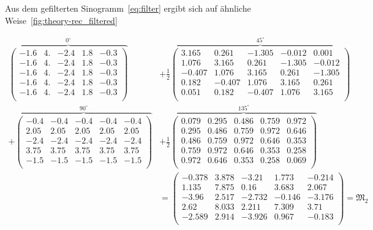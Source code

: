 \documentclass[slug=PET, room=Andreas-Schubert-Bau\,\ 424A,
supervisor=Carsten\ Bittrich, coursedate=10.\ 01.\ 2020, ngerman]{../../Lab_Report_LaTeX/lab_report}
\begin{document}
Aus dem gefilterten Sinogramm~\eqref{eq:filter} ergibt sich auf
\"ahnliche Weise~\ref{fig:theory-rec_filtered}

{\footnotesize
\setlength{\arraycolsep}{2.5pt}

\begin{align}
  \label{eq:simplerepr}
  \overbrace{\begin{pmatrix}
      -1.6 & 4. & -2.4 & 1.8 & -0.3\\
      -1.6 & 4. & -2.4 & 1.8 & -0.3\\
      -1.6 & 4. & -2.4 & 1.8 & -0.3\\
      -1.6 & 4. & -2.4 & 1.8 & -0.3\\
      -1.6 & 4. & -2.4 & 1.8 & -0.3\\
    \end{pmatrix}}^{0^\circ} & + \frac{1}{2}\overbrace{\begin{pmatrix}
      3.165 & 0.261 & -1.305 & -0.012 & 0.001\\
      1.076 & 3.165 & 0.261 & -1.305 & -0.012\\
      -0.407 & 1.076 & 3.165 & 0.261 & -1.305\\
      0.182 & -0.407 & 1.076 & 3.165 & 0.261\\
      0.051 & 0.182 & -0.407 & 1.076 & 3.165\\
    \end{pmatrix}}^{45^\circ} \nonumber \\ +
  \overbrace{\begin{pmatrix}
      -0.4 & -0.4 & -0.4 & -0.4 & -0.4\\
      2.05 & 2.05 & 2.05 & 2.05 & 2.05\\
      -2.4 & -2.4 & -2.4 & -2.4 & -2.4\\
      3.75 & 3.75 & 3.75 & 3.75 & 3.75\\
      -1.5 & -1.5 & -1.5 & -1.5 & -1.5\\
    \end{pmatrix}}^{90^\circ} &+ \frac{1}{2}\overbrace{\begin{pmatrix}
      0.079 & 0.295 & 0.486 & 0.759 & 0.972\\
      0.295 & 0.486 & 0.759 & 0.972 & 0.646\\
      0.486 & 0.759 & 0.972 & 0.646 & 0.353\\
      0.759 & 0.972 & 0.646 & 0.353 & 0.258\\
      0.972 & 0.646 & 0.353 & 0.258 & 0.069\\
    \end{pmatrix}}^{135^\circ}\nonumber \\
           &= \begin{pmatrix}
             -0.378 & 3.878 & -3.21 & 1.773 & -0.214\\
             1.135 & 7.875 & 0.16 & 3.683 & 2.067\\
             -3.96 & 2.517 & -2.732 & -0.146 & -3.176\\
             2.62 & 8.033 & 2.211 & 7.309 & 3.71\\
             -2.589 & 2.914 & -3.926 & 0.967 & -0.183\\
           \end{pmatrix} = \mathfrak{M}_2
\end{align}
}
\end{document}
